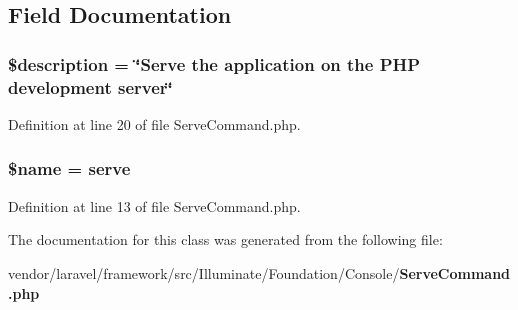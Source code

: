 \subsection{Field Documentation}
\subsubsection[{\$description}]{\setlength{\rightskip}{0pt plus 5cm}\$description = \char`\"{}Serve the application {\bf on} the P\+H\+P development server\char`\"{}\hspace{0.3cm}{\ttfamily [protected]}}\label{class_illuminate_1_1_foundation_1_1_console_1_1_serve_command_a87b032cba06009e3467abf1c8018d960}


Definition at line 20 of file Serve\+Command.\+php.

\subsubsection[{\$name}]{\setlength{\rightskip}{0pt plus 5cm}\${\bf name} = \textquotesingle{}serve\textquotesingle{}\hspace{0.3cm}{\ttfamily [protected]}}\label{class_illuminate_1_1_foundation_1_1_console_1_1_serve_command_ab2fc40d43824ea3e1ce5d86dee0d763b}


Definition at line 13 of file Serve\+Command.\+php.



The documentation for this class was generated from the following file\+:\begin{DoxyCompactItemize}
\item 
vendor/laravel/framework/src/\+Illuminate/\+Foundation/\+Console/{\bf Serve\+Command.\+php}\end{DoxyCompactItemize}
